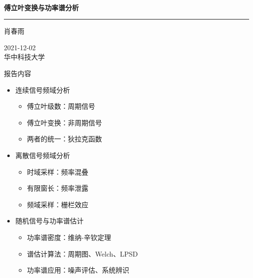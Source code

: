 \documentclass[UTF8]{ctexbeamer}
\begin{document}
    
\begin{frame}               %
    \thispagestyle{empty}
    \addtocounter{framenumber}{-1}

    \begin{center}
        \ {}
        \vspace{12mm}

        \begingroup         %
        \color{darkblue}\bfseries 傅立叶变换与功率谱分析
        \endgroup

        {\color{darkred}\rule{\textwidth}{0.7pt}}

        \vspace{3mm}

        肖春雨

        \vspace{10mm}

        2021-12-02 \\
        {\small 华中科技大学}
    \end{center}
\end{frame}



\begin{frame}{报告内容}
    \begin{itemize}
        \setlength\itemsep{7pt}
        \item[$\color{darkblue}\bullet$] {\color{darkblue} 连续信号频域分析}
        \begin{itemize}
            \item 傅立叶级数：周期信号
            \item 傅立叶变换：非周期信号
            \item 两者的统一：狄拉克函数
        \end{itemize}

        \item[$\color{darkblue}\bullet$] {\color{darkblue} 离散信号频域分析}
        \begin{itemize}
            \item 时域采样：频率混叠
            \item 有限窗长：频率泄露
            \item 频域采样：栅栏效应
        \end{itemize}

        \item[$\color{darkblue}\bullet$] {\color{darkblue} 随机信号与功率谱估计}
        \begin{itemize}
            \item 功率谱密度：维纳-辛钦定理
            \item 谱估计算法：周期图、Welch、LPSD
            \item 功率谱应用：噪声评估、系统辨识
        \end{itemize}
    \end{itemize}
\end{frame}
\end{document}
